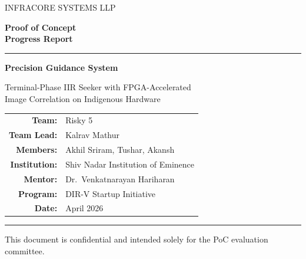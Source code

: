 \documentclass[12pt,a4paper]{article}
\begin{document}
\begin{titlepage}
\pagecolor{CoverBg}
\color{white}
\vspace*{1.8cm}
\begin{center}

{\fontsize{10}{12}\selectfont\color{Border}\MakeUppercase{InfraCore Systems LLP}}

\vspace{1.6cm}

{\fontsize{30}{36}\selectfont\bfseries Proof of Concept\\[6pt] Progress Report}

\vspace{0.9cm}
{\color{Steel}\rule{10cm}{1pt}}

\vspace{0.9cm}

{\fontsize{18}{22}\selectfont\bfseries Precision Guidance System}

\vspace{0.5cm}

{\fontsize{12}{16}\selectfont Terminal-Phase IIR Seeker with FPGA-Accelerated\\[2pt]
Image Correlation on Indigenous Hardware}

\vspace{2.8cm}

\begin{tabular}{rl}
{\color{Border}\textbf{Team:}}        & Risky 5 \\[5pt]
{\color{Border}\textbf{Team Lead:}}   & Kalrav Mathur \\[5pt]
{\color{Border}\textbf{Members:}}     & Akhil Sriram, Tushar, Akansh \\[5pt]
{\color{Border}\textbf{Institution:}} & Shiv Nadar Institution of Eminence \\[5pt]
{\color{Border}\textbf{Mentor:}}      & Dr.\ Venkatnarayan Hariharan \\[5pt]
{\color{Border}\textbf{Program:}}     & DIR-V Startup Initiative \\[5pt]
{\color{Border}\textbf{Date:}}        & April 2026 \\
\end{tabular}

\vfill
{\color{Steel}\rule{10cm}{0.5pt}}
\vspace{0.6cm}

{\small\color{Border}This document is confidential and intended solely for the PoC evaluation committee.}

\end{center}
\end{titlepage}
\nopagecolor
\end{document}

